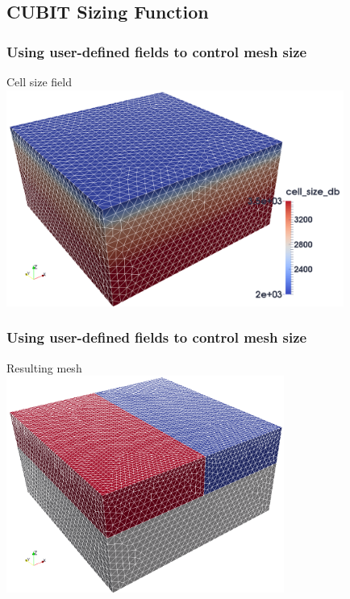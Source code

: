 \documentclass{beamer}
\begin{document}
\subsection{CUBIT Sizing Function}

\begin{frame}
  \frametitle{Using user-defined fields to control mesh size}
 
  Cell size field\\
  \includegraphics[height=7.1cm]{figs/cellsize_spatialdb}
 
\end{frame}


\begin{frame}
  \frametitle{Using user-defined fields to control mesh size}
 
  Resulting mesh\\
  \includegraphics[height=7.1cm]{figs/cellsize_spatialdb_mesh}
 
\end{frame}
\end{document}
